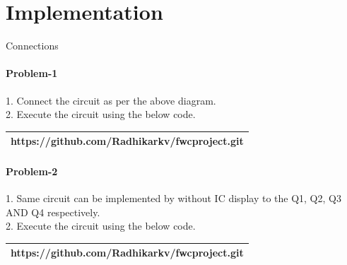 \documentclass[10pt, a4paper]{article}
\begin{document}
\section{Implementation}

\begin{center}
    Connections
\end{center}

        
    \paragraph{Problem-1}
    1. Connect the circuit as per the above diagram.\\
    2. Execute the circuit using the below code.\\
\begin{tabularx}{0.46\textwidth} { 
  | >{\centering\arraybackslash}X |}
  \hline
  https://github.com/Radhikarkv/fwcproject.git\\
  \hline
\end{tabularx}





	\paragraph{Problem-2}
1. Same circuit can be implemented by without IC display to the Q1, Q2, Q3 AND Q4 respectively.\\
2. Execute the circuit using the below code.\\

\begin{tabularx}{0.46\textwidth} { 
  | >{\centering\arraybackslash}X |}
  \hline
 https://github.com/Radhikarkv/fwcproject.git\\
  \hline
\end{tabularx}


\end{document}
